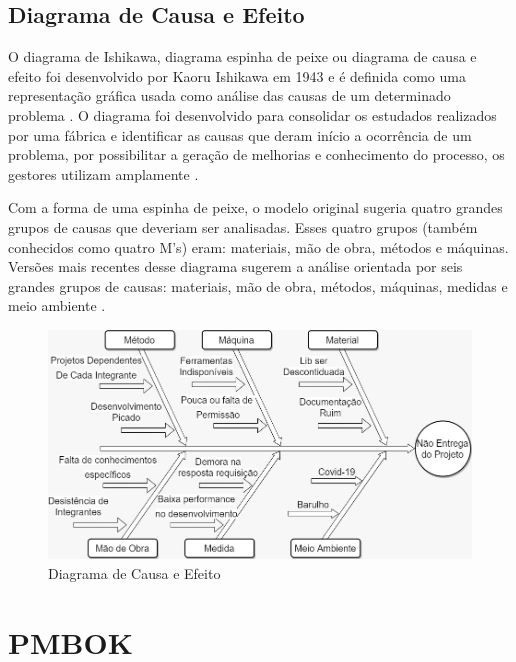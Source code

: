 \subsection{Diagrama de Causa e Efeito}

O diagrama de Ishikawa, diagrama espinha de peixe ou diagrama de causa e efeito foi desenvolvido por Kaoru Ishikawa em 1943 e é definida como uma representação gráfica usada como análise das causas de um determinado problema \cite{santos2017planos}.
O diagrama foi desenvolvido para consolidar os estudados realizados por uma fábrica e identificar as causas que deram início a ocorrência de um problema, por possibilitar a geração de melhorias e conhecimento do processo, os gestores utilizam amplamente \cite{ribeiro2017definiccao}.

Com a forma de uma espinha de peixe, o modelo original sugeria quatro grandes grupos de causas que deveriam ser analisadas. Esses quatro grupos (também conhecidos como quatro M's) eram: materiais, mão de obra, métodos e máquinas. Versões mais recentes desse diagrama sugerem a análise orientada por seis grandes grupos de causas: materiais, mão de obra, métodos, máquinas, medidas e meio ambiente \cite{selner1999analise}.

\begin{landscape}
	\begin{figure}[htb]
		\caption{\label{causaeefeito1}Diagrama de Causa e Efeito}
		\begin{center}
			\includegraphics[scale=0.80]{./Figuras/Diagrama causa e efeito.jpeg}
		\end{center}
	\end{figure}
\end{landscape}

\section{PMBOK}

